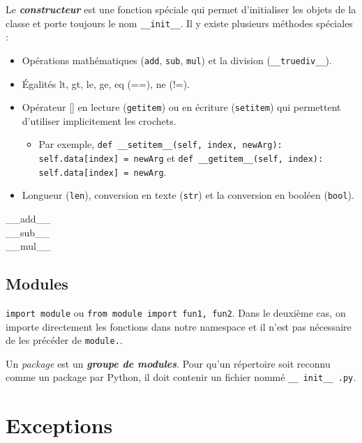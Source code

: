 \documentclass[10pt, french]{article}
\begin{document}
\begin{multicols*}{2}
Le \textbf{\textit{constructeur}} est une fonction spéciale qui permet d'initialiser les objets de la classe et porte toujours le nom \texttt{\_\_init\_\_}. Il y existe plusieurs méthodes spéciales : 
\begin{itemize}
	\item	Opérations mathématiques (\texttt{add}, \texttt{sub}, \texttt{mul}) et la division (\texttt{\_\_truediv\_\_}).
	\item	Égalités lt, gt, le, ge, eq (==), ne (!=).
	\item	Opérateur [] en lecture (\texttt{getitem}) ou en écriture (\texttt{setitem}) qui permettent d'utiliser implicitement les crochets.
		\begin{itemize}
		\item	Par exemple, \texttt{def \_\_setitem\_\_(self, index, newArg): self.data[index] = newArg} et \texttt{def \_\_getitem\_\_(self, index): self.data[index] = newArg}.
		\end{itemize}
	\item	Longueur (\texttt{len}), conversion en texte (\texttt{str}) et la conversion en booléen (\texttt{bool}).
\end{itemize}
\begin{description}
	\item[\_\_add\_\_]
	\item[\_\_sub\_\_]
	\item[\_\_mul\_\_]
\end{description}


\columnbreak
\subsection{Modules}
\texttt{import module} ou \texttt{from module import fun1, fun2}. Dans le deuxième cas, on importe directement les fonctions dans notre namespace et il n'est pas nécessaire de les précéder de \texttt{module.}.

\bigskip

Un \og \textit{package} \fg{} est un \textbf{\textit{groupe de modules}}. Pour qu'un répertoire soit reconnu comme un package par Python, il doit contenir un fichier nommé \texttt{\_\_ init\_\_ .py}.



\newpage
\section{Exceptions}

\end{multicols*}
\end{document}
